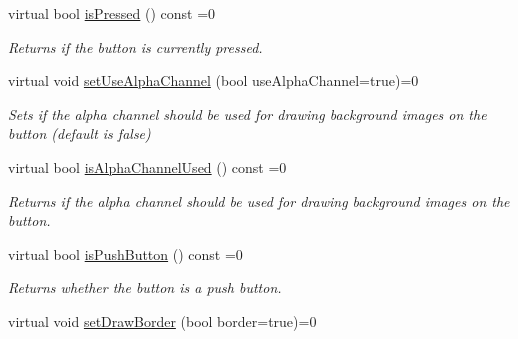 \begin{DoxyCompactItemize}
\mbox{\label{classirr_1_1gui_1_1IGUIButton_a2621bd10a5eb91fa14037feb9378c252}} 
virtual bool \hyperlink{classirr_1_1gui_1_1IGUIButton_a2621bd10a5eb91fa14037feb9378c252}{is\+Pressed} () const =0
\begin{DoxyCompactList}\small\item\em Returns if the button is currently pressed. \end{DoxyCompactList}\item 
\mbox{\label{classirr_1_1gui_1_1IGUIButton_a3d7727e7807e8b71dae6f81a44737e8a}} 
virtual void \hyperlink{classirr_1_1gui_1_1IGUIButton_a3d7727e7807e8b71dae6f81a44737e8a}{set\+Use\+Alpha\+Channel} (bool use\+Alpha\+Channel=true)=0
\begin{DoxyCompactList}\small\item\em Sets if the alpha channel should be used for drawing background images on the button (default is false) \end{DoxyCompactList}\item 
\mbox{\label{classirr_1_1gui_1_1IGUIButton_af4cb47805f2a296506b8a0b4cb65fddf}} 
virtual bool \hyperlink{classirr_1_1gui_1_1IGUIButton_af4cb47805f2a296506b8a0b4cb65fddf}{is\+Alpha\+Channel\+Used} () const =0
\begin{DoxyCompactList}\small\item\em Returns if the alpha channel should be used for drawing background images on the button. \end{DoxyCompactList}\item 
\mbox{\label{classirr_1_1gui_1_1IGUIButton_abb12a92ba70d1fe738655d04ef73734f}} 
virtual bool \hyperlink{classirr_1_1gui_1_1IGUIButton_abb12a92ba70d1fe738655d04ef73734f}{is\+Push\+Button} () const =0
\begin{DoxyCompactList}\small\item\em Returns whether the button is a push button. \end{DoxyCompactList}\item 
\mbox{\label{classirr_1_1gui_1_1IGUIButton_aa6e68e5335f67472bde80b530b6d31fd}} 
virtual void \hyperlink{classirr_1_1gui_1_1IGUIButton_aa6e68e5335f67472bde80b530b6d31fd}{set\+Draw\+Border} (bool border=true)=0

\end{DoxyCompactItemize}
